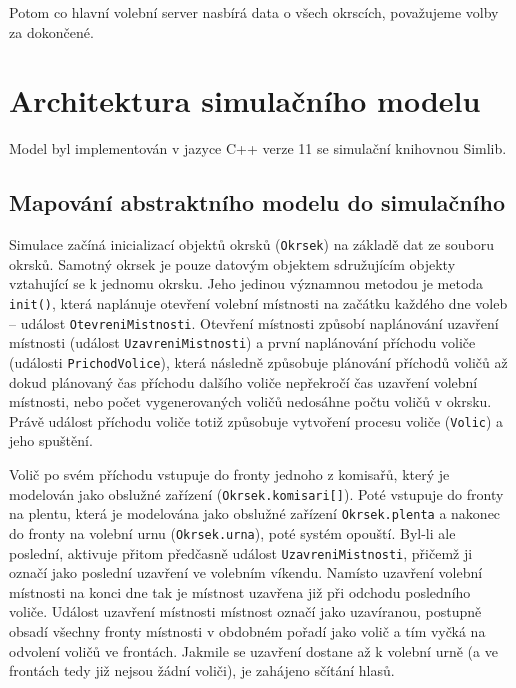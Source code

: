 \documentclass[12pt,a4paper,titlepage,final]{article}
\begin{document}
Potom co hlavní volební server nasbírá data o všech okrscích, považujeme volby za dokončené.

\section{Architektura simulačního modelu} \label{architektura}

Model byl implementován v jazyce C++ verze 11 se simulační knihovnou Simlib.

\subsection{Mapování abstraktního modelu do simulačního}

Simulace začíná inicializací objektů okrsků (\texttt{Okrsek}) na základě dat ze souboru okrsků. Samotný okrsek je pouze datovým objektem sdružujícím objekty vztahující se k jednomu okrsku. Jeho jedinou významnou metodou je metoda \texttt{init()}, která naplánuje otevření volební místnosti na začátku každého dne voleb -- událost \texttt{OtevreniMistnosti}. Otevření místnosti způsobí naplánování uzavření místnosti (událost \texttt{UzavreniMistnosti}) a první naplánování příchodu voliče (události \texttt{PrichodVolice}), která následně způsobuje plánování příchodů voličů až dokud plánovaný čas příchodu dalšího voliče nepřekročí čas uzavření volební místnosti, nebo počet vygenerovaných voličů nedosáhne počtu voličů v okrsku. Právě událost příchodu voliče totiž způsobuje vytvoření procesu voliče (\texttt{Volic}) a jeho spuštění.

Volič po svém příchodu vstupuje do fronty jednoho z komisařů, který je modelován jako obslužné zařízení (\texttt{Okrsek.komisari[]}). Poté vstupuje do fronty na plentu, která je modelována jako obslužné zařízení \texttt{Okrsek.plenta} a nakonec do fronty na volební urnu (\texttt{Okrsek.urna}), poté systém opouští. Byl-li ale poslední, aktivuje přitom předčasně událost \texttt{UzavreniMistnosti}, přičemž ji označí jako poslední uzavření ve volebním víkendu. Namísto uzavření volební místnosti na konci dne tak je místnost uzavřena již při odchodu posledního voliče. Událost uzavření místnosti místnost označí jako uzavíranou, postupně obsadí všechny fronty místnosti v obdobném pořadí jako volič a tím vyčká na odvolení voličů ve frontách. Jakmile se uzavření dostane až k volební urně (a ve frontách tedy již nejsou žádní voliči), je zahájeno sčítání hlasů.
\end{document}
